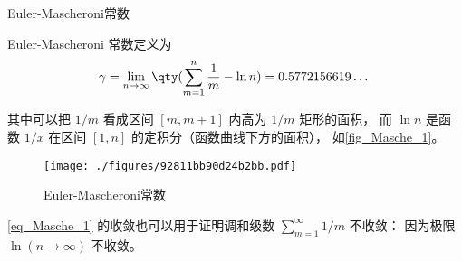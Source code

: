 
\begin{issues}
\issueDraft
\end{issues}


\begin{definition}{Euler-Mascheroni常数}

\end{definition}
Euler-Mascheroni 常数定义为
\begin{equation}\label{eq_Masche_1}
\gamma = \lim_{n\to\infty} \qty(\sum_{m=1}^n \frac{1}{m} - \ln n) = 0.5772156619\dots~
\end{equation}

其中可以把 $1/m$ 看成区间 $[m, m+1]$ 内高为 $1/m$ 矩形的面积， 而 $\ln n$ 是函数 $1/x$ 在区间 $[1,n]$ 的定积分（函数曲线下方的面积）， 如\autoref{fig_Masche_1}。

\begin{figure}[ht]
\centering
\texttt{[image: ./figures/92811bb90d24b2bb.pdf]}
\caption{Euler-Mascheroni常数} \label{fig_Masche_1}
\end{figure}

\autoref{eq_Masche_1} 的收敛也可以用于证明调和级数 $\sum_{m=1}^\infty 1/m$ 不收敛： 因为极限 $\ln(n\to\infty)$ 不收敛。
